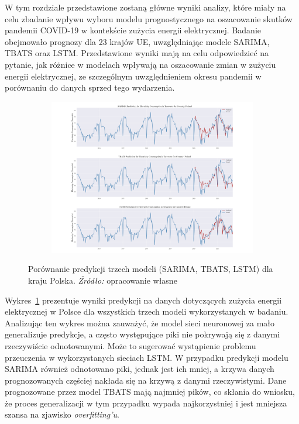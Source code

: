 \documentclass[polish, twoside, 12pt, a4paper]{article}
\theoremstyle{definition}
\theoremstyle{plain}
\theoremstyle{remark}
\begin{document}
W tym rozdziale przedstawione zostaną główne wyniki analizy, które miały na celu zbadanie wpływu wyboru modelu prognostycznego na oszacowanie skutków pandemii COVID-19 w kontekście zużycia energii elektrycznej. Badanie obejmowało prognozy dla 23 krajów UE, uwzględniając modele SARIMA, TBATS oraz LSTM. Przedstawione wyniki mają na celu odpowiedzieć na pytanie, jak różnice w modelach wpływają na oszacowanie zmian w zużyciu energii elektrycznej, ze szczególnym uwzględnieniem okresu pandemii w porównaniu do danych sprzed tego wydarzenia. 

\begin{figure}[hbt]
  \centering

  \begin{subfigure}[t]{0.95\textwidth}
    \includegraphics[width=\textwidth]{./out_figures/model_comparison_Poland.png}
  \end{subfigure}

  \captionsetup{margin=10pt,font=small,labelfont=bf,width=.8\textwidth}

  \caption[Porównanie predykcji trzech modeli (SARIMA, TBATS, LSTM) dla kraju Polska.]{Porównanie predykcji trzech modeli (SARIMA, TBATS, LSTM) dla kraju Polska. \textit{Źródło:} opracowanie własne}\label{fig:x13}
\end{figure}

Wykres~\ref{fig:x13} prezentuje wyniki predykcji na danych dotyczących zużycia energii elektrycznej w Polsce dla wszystkich trzech modeli wykorzystanych w badaniu. Analizując ten wykres można zauważyć, że model sieci neuronowej za mało generalizuje predykcje, a często występujące piki nie pokrywają się z danymi rzeczywiście odnotowanymi. Może to sugerować wystąpienie problemu przeuczenia w wykorzystanych sieciach LSTM. W przypadku predykcji modelu SARIMA również odnotowano piki, jednak jest ich mniej, a krzywa danych prognozowanych częściej nakłada się na krzywą z danymi rzeczywistymi. Dane prognozowane przez model TBATS mają najmniej pików, co skłania do wniosku, że proces generalizacji w tym przypadku wypada najkorzystniej i jest mniejsza szansa na zjawisko \textit{overfitting'u}. 
\end{document}
